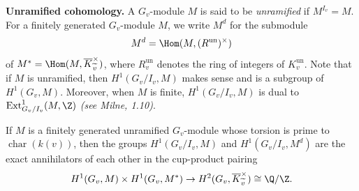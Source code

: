 \documentclass[11pt]{article}
\begin{document}
\bigskip
\noindent\textbf{Unramified cohomology.}
A \( G_v \)-module \( M \) is said to be \emph{unramified} if \( M^{I_v} = M \).
For a finitely generated \( G_v \)-module \( M \), we write \( M^d \) for the submodule
\[ M^d = \Hom(M, (R^{\operatorname{un}})^\times) \]
of \( M^* = \Hom(M, \overline{K}_{\widetilde{v}}^\times) \), where \( R_v^{\operatorname{un}} \) denotes
the ring of integers of \( K_v^{\operatorname{un}} \). Note that if \( M \) is
unramified, then \( H^1(G_v/I_v, M) \) makes sense and is a subgroup of
\( H^1(G_v, M) \). Moreover, when \( M \) is finite, \( H^1(G_v/I_v, M) \) is dual
to \( \operatorname{Ext}^1_{G_v/I_v}(M, \Z) \) \textit{(see Milne, 1.10)}.

\begin{thm}
    If \( M \) is a finitely generated unramified \( G_v \)-module whose torsion is
    prime to \( \operatorname{char}(k(v)) \), then the groups
    \( H^1(G_v/I_v, M) \) and \( H^1(G_v/I_v, M^d) \) are the exact annihilators
    of each other in the cup-product pairing
    \[ H^1(G_v, M) \times H^1(G_v, M^*) \to H^2(G_v, \overline{K}_{\widetilde{v}}^\times) \cong \Q/\Z. \]
\end{thm}

\end{document}
